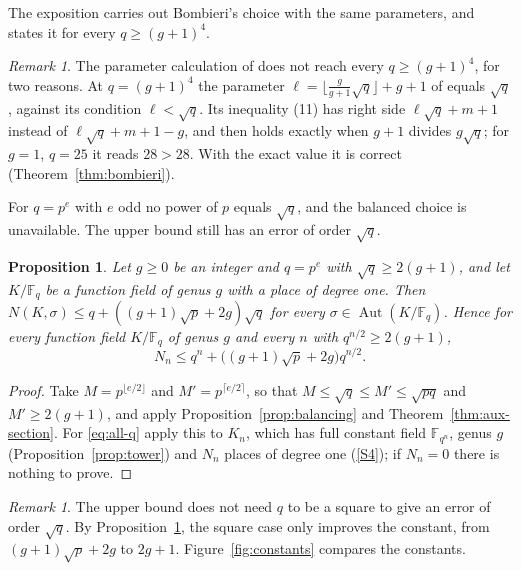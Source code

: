 \documentclass[11pt]{amsbook}
\theoremstyle{plain}
\newtheorem{proposition}[theorem]{Proposition}
\theoremstyle{definition}
\theoremstyle{remark}
\newtheorem{remark}[theorem]{Remark}
\numberwithin{equation}{section}
\numberwithin{figure}{chapter}
\numberwithin{table}{chapter}
\newcommand{\F}{\mathbb{F}}
\DeclareMathOperator{\Aut}{Aut}
\begin{document}
The exposition \cite{Tao2014} carries out Bombieri's choice with
the same parameters, and states it for every $q\ge(g+1)^4$.

\begin{remark}\label{rem:tao}
The parameter calculation of \cite{Tao2014} does not reach every
$q\ge(g+1)^4$, for two reasons. At $q=(g+1)^4$ the
parameter $\ell=\lfloor\frac g{g+1}\sqrt q\rfloor+g+1$ of
\cite{Tao2014} equals $\sqrt q$, against its condition
$\ell<\sqrt q$. Its inequality (11) has right side
$\ell\sqrt q+m+1$ instead of $\ell\sqrt q+m+1-g$, and then holds
exactly when $g+1$ divides $g\sqrt q$; for $g=1$, $q=25$ it reads
$28>28$. With the exact value it is correct
(Theorem~\ref{thm:bombieri}).
\end{remark}

For $q=p^e$ with $e$ odd no power of $p$ equals $\sqrt q$, and the
balanced choice is unavailable. The upper bound still has an error
of order $\sqrt q$.

\begin{proposition}\label{prop:all-q}
Let $g\ge0$ be an integer and $q=p^e$ with $\sqrt q\ge2(g+1)$, and
let $K/\F_q$ be a function
field of genus $g$ with a place of degree one. Then
$N(K,\sigma)\le q+((g+1)\sqrt p+2g)\sqrt q$ for every
$\sigma\in\Aut(K/\F_q)$. Hence for every function field $K/\F_q$ of
genus $g$ and every $n$ with $q^{n/2}\ge2(g+1)$,
\begin{equation}\label{eq:all-q}
N_n\le q^n+\bigl((g+1)\sqrt p+2g\bigr)q^{n/2}.
\end{equation}
\end{proposition}

\begin{proof}
Take $M=p^{\lfloor e/2\rfloor}$ and $M'=p^{\lceil e/2\rceil}$, so
that $M\le\sqrt q\le M'\le\sqrt{pq}$ and $M'\ge2(g+1)$, and apply
Proposition~\ref{prop:balancing} and
Theorem~\ref{thm:aux-section}. For \eqref{eq:all-q} apply this to
$K_n$, which has full constant field $\F_{q^n}$, genus $g$
(Proposition~\ref{prop:tower}) and $N_n$ places of degree one
(\ref{S4}); if $N_n=0$ there is nothing to prove.
\end{proof}

\begin{remark}\label{rem:square}
The upper bound does not need $q$ to be a square to give an error
of order $\sqrt q$. By Proposition~\ref{prop:all-q}, the square
case only improves the constant, from $(g+1)\sqrt p+2g$ to $2g+1$.
Figure~\ref{fig:constants} compares the constants.
\end{remark}
\end{document}

